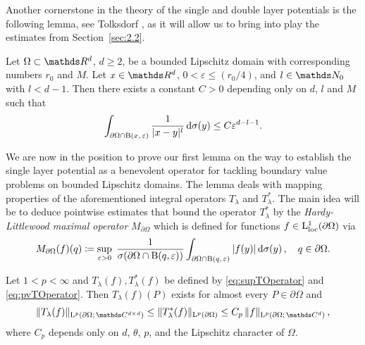 Another cornerstone in the theory of the single and double layer potentials is the following lemma, see Tolksdorf \cite[Lem.\@~4.3.2]{tolksdorf}, as it will allow us to bring into play the estimates from Section~\ref{sec:2.2}.

\begin{lem}
  \label{lem:central}
  Let $\Omega \subset \R^d$, $d \geq 2$, be a bounded Lipschitz domain with corresponding numbers $r_0$ and $M$.
  Let $x \in \R^d$, $0 < \varepsilon \leq (r_0/4)$, and $l \in \N_0$ with $l < d - 1$.
  Then there exists a constant $C > 0$ depending only on $d$, $l$ and $M$ such that
  \begin{align*}
    \int_{\partial\Omega \cap \mathrm{B}(x,\, \varepsilon)} \frac{1}{|x - y|^l} \, {\operatorname{d}\!{\sigma}}(y) \leq C \varepsilon^{d - l - 1}.
  \end{align*}
\end{lem}

We are now in the position to prove our first lemma on the way to establish the single layer potential as a benevolent operator for tackling boundary value problems on bounded Lipschitz domains. 
The lemma deals with mapping properties of the aforementioned integral operators $T_\lambda$ and $T_\lambda^*$.
The main idea will be to deduce pointwise estimates that bound the operator $T_\lambda^*$ by the \emph{Hardy-Littlewood maximal operator} $M_{\partial\Omega}$ which is defined for functions $f \in \mathrm{L}^1_{\mathrm{loc}}(\partial\Omega)$ via
\begin{align*}
  M_{\partial\Omega}(f)(q) \coloneqq \sup_{\varepsilon > 0} \; \frac{1}{\sigma(\partial\Omega \cap \mathrm{B}(q, \varepsilon))} \int_{\partial\Omega \cap \mathrm{B}(q,\,\varepsilon)} |f(y)| \, {\operatorname{d}\!{\sigma}}(y)\,, \quad q \in \partial\Omega.
\end{align*}

\begin{lem}
  \label{lem:lpBoundednessT}
  Let $1 < p < \infty$ and $T_\lambda(f), T_\lambda^*(f)$ be defined by \eqref{eq:supTOperator} and \eqref{eq:pvTOperator}.
  Then $T_\lambda(f)(P)$ exists for almost every $P \in \partial\Omega$ and
  \begin{align}
    \label{eq:lpBoundednessT}
    \|T_\lambda(f) \|_{\Ell^p(\partial\Omega; \,\C^{d \times d})}
    \leq \|T_\lambda^*(f) \|_{\Ell^p(\partial\Omega)}
    \leq C_p \, \|f\|_{\Ell^p(\partial\Omega; \,\C^d)}\,,
  \end{align}
  where $C_p$ depends only on $d$, $\theta$, $p$, and the Lipschitz character of $\Omega$.
\end{lem}


